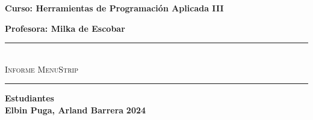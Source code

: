 \begin{titlepage}
\begin{center}
      {\Large \textbf{Curso: Herramientas de Programación Aplicada III}}\medskip
      
      {\Large \textbf{Profesora: Milka de Escobar}}

      \rule{\linewidth}{0.75mm}\\
          {\Large \textsc{Informe MenuStrip}} 
      \rule{\linewidth}{0.75mm}\medskip

      {\Large \textbf{Estudiantes}}\\
      \vspace{5mm}
      {\Large \textbf{Elbin Puga, Arland Barrera}}
      \vfill
      {\Huge \textbf{2024}}

  \end{center}
\end{titlepage}
